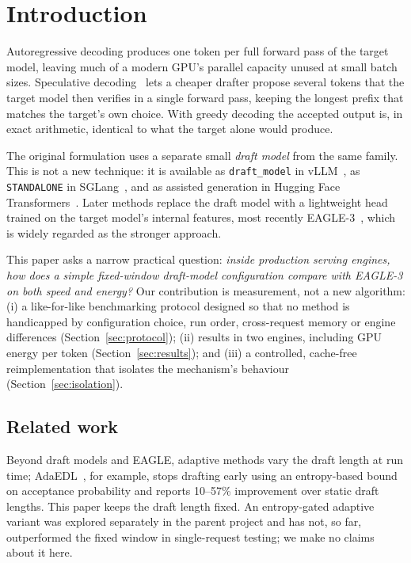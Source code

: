 \documentclass[conference]{IEEEtran}
\begin{document}
\section{Introduction}

Autoregressive decoding produces one token per full forward pass of the
target model, leaving much of a modern GPU's parallel capacity unused at
small batch sizes. Speculative decoding~\cite{leviathan2023fast,chen2023accelerating}
lets a cheaper drafter propose several tokens that the target model then
verifies in a single forward pass, keeping the longest prefix that matches
the target's own choice. With greedy decoding the accepted output is, in
exact arithmetic, identical to what the target alone would produce.

The original formulation uses a separate small \emph{draft model} from the
same family. This is not a new technique: it is available as
\texttt{draft\_model} in vLLM~\cite{kwon2023vllm}, as \texttt{STANDALONE} in
SGLang~\cite{zheng2024sglang}, and as assisted generation in Hugging Face
Transformers~\cite{gante2023assisted}. Later methods replace the draft model
with a lightweight head trained on the target model's internal features,
most recently EAGLE-3~\cite{li2024eagle,li2025eagle3}, which is widely
regarded as the stronger approach.

This paper asks a narrow practical question: \emph{inside production serving
engines, how does a simple fixed-window draft-model configuration compare
with EAGLE-3 on both speed and energy?} Our contribution is measurement, not
a new algorithm: (i) a like-for-like benchmarking protocol designed so that
no method is handicapped by configuration choice, run order, cross-request
memory or engine differences (Section~\ref{sec:protocol}); (ii) results in
two engines, including GPU energy per token (Section~\ref{sec:results});
and (iii) a controlled, cache-free reimplementation that isolates the
mechanism's behaviour (Section~\ref{sec:isolation}).

\subsection{Related work}

Beyond draft models and EAGLE, adaptive methods vary the draft length at run
time; AdaEDL~\cite{adaedl2024}, for example, stops drafting early using an
entropy-based bound on acceptance probability and reports 10--57\%
improvement over static draft lengths. This paper keeps the draft length
fixed. An entropy-gated adaptive variant was explored separately in the
parent project and has not, so far, outperformed the fixed window in
single-request testing; we make no claims about it here.
\end{document}
